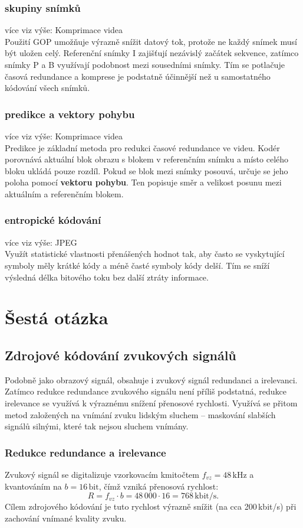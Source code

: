 \subsection{skupiny snímků}
více viz výše: Komprimace videa\\
Použití GOP umožňuje výrazně snížit datový tok, protože ne každý snímek musí být uložen celý. Referenční snímky I zajišťují nezávislý začátek sekvence, zatímco snímky P a B využívají podobnost mezi sousedními snímky. Tím se potlačuje časová redundance a komprese je podstatně účinnější než u samostatného kódování všech snímků.
\subsection{predikce a vektory pohybu}
více viz výše: Komprimace videa\\
Predikce je základní metoda pro redukci časové redundance ve videu. Kodér porovnává aktuální blok obrazu s blokem v referenčním snímku a místo celého bloku ukládá pouze rozdíl. Pokud se blok mezi snímky posouvá, určuje se jeho poloha pomocí \textbf{vektoru pohybu}. Ten popisuje směr a velikost posunu mezi aktuálním a referenčním blokem. 
\subsection{entropické kódování}
více viz výše: JPEG\\
Využít statistické vlastnosti přenášených hodnot tak, aby často se vyskytující symboly měly krátké kódy a méně časté symboly kódy delší. Tím se sníží výsledná délka bitového toku bez další ztráty informace.


\chapter{Šestá otázka}
\section{Zdrojové kódování zvukových signálů}
Podobně jako obrazový signál, obsahuje i zvukový signál redundanci a irelevanci.
Zatímco redukce redundance zvukového signálu není příliš podstatná, redukce irelevance se využívá k výraznému snížení přenosové rychlosti.
Využívá se přitom metod založených na vnímání zvuku lidským sluchem -- maskování slabších signálů silnými, které tak nejsou sluchem vnímány.

\subsection{Redukce redundance a irelevance}
Zvukový signál se digitalizuje vzorkovacím kmitočtem $f_{vz} = 48\,\text{kHz}$ a kvantováním na $b = 16\,\text{bit}$, čímž vzniká přenosová rychlost:
\[
R = f_{vz} \cdot b = 48\,000 \cdot 16 = 768\,\text{kbit/s}.
\]
Cílem zdrojového kódování je tuto rychlost výrazně snížit (na cca 200\,kbit/s) při zachování vnímané kvality zvuku.


